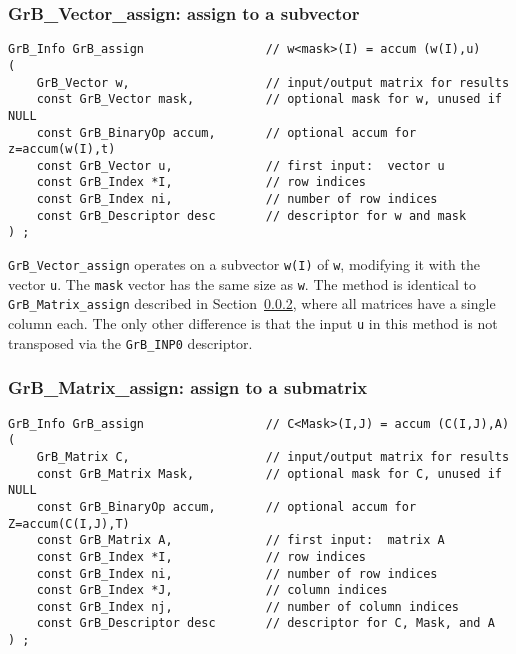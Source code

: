 \documentclass[12pt]{article}
\begin{document}
\subsubsection{{\sf GrB\_Vector\_assign:} assign to a subvector }
\label{assign_vector}

\begin{mdframed}[userdefinedwidth=6in]
{\footnotesize
\begin{verbatim}
GrB_Info GrB_assign                 // w<mask>(I) = accum (w(I),u)
(
    GrB_Vector w,                   // input/output matrix for results
    const GrB_Vector mask,          // optional mask for w, unused if NULL
    const GrB_BinaryOp accum,       // optional accum for z=accum(w(I),t)
    const GrB_Vector u,             // first input:  vector u
    const GrB_Index *I,             // row indices
    const GrB_Index ni,             // number of row indices
    const GrB_Descriptor desc       // descriptor for w and mask
) ;
\end{verbatim} } \end{mdframed}

\verb'GrB_Vector_assign' operates on a subvector \verb'w(I)' of \verb'w',
modifying it with the vector \verb'u'.  The \verb'mask' vector has the same
size as \verb'w'.  The method is identical to \verb'GrB_Matrix_assign'
described in Section~\ref{assign_matrix}, where all matrices have a single
column each.  The only other difference is that the input \verb'u' in this
method is not transposed via the \verb'GrB_INP0' descriptor.

\newpage
\subsubsection{{\sf GrB\_Matrix\_assign:} assign to a submatrix }
\label{assign_matrix}

\begin{mdframed}[userdefinedwidth=6in]
{\footnotesize
\begin{verbatim}
GrB_Info GrB_assign                 // C<Mask>(I,J) = accum (C(I,J),A)
(
    GrB_Matrix C,                   // input/output matrix for results
    const GrB_Matrix Mask,          // optional mask for C, unused if NULL
    const GrB_BinaryOp accum,       // optional accum for Z=accum(C(I,J),T)
    const GrB_Matrix A,             // first input:  matrix A
    const GrB_Index *I,             // row indices
    const GrB_Index ni,             // number of row indices
    const GrB_Index *J,             // column indices
    const GrB_Index nj,             // number of column indices
    const GrB_Descriptor desc       // descriptor for C, Mask, and A
) ;
\end{verbatim} } \end{mdframed}
\end{document}
